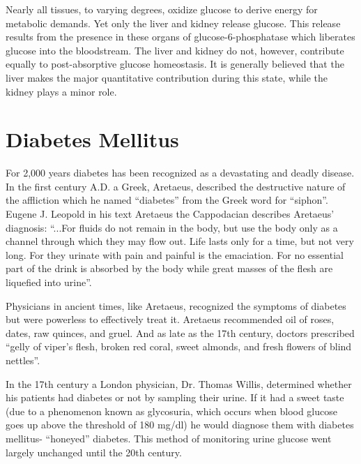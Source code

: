 Nearly all tissues, to varying degrees, oxidize glucose to derive energy for metabolic demands. Yet only the liver and kidney release glucose. This release results from the presence in these organs of glucose-6-phosphatase which liberates glucose into the bloodstream. The liver and kidney do not, however, contribute equally to post-absorptive glucose homeostasis. It is generally believed that the liver makes the major quantitative contribution during this state, while the kidney plays a minor role. 

\section{Diabetes Mellitus}
\label{sec:DiabetesMellitus}

For 2,000 years diabetes has been recognized as a devastating and deadly disease. In the first century A.D. a Greek, Aretaeus, described the destructive nature of the affliction which he named ``diabetes'' from the Greek word for ``siphon''. Eugene J. Leopold in his text Aretaeus the Cappodacian describes Aretaeus' diagnosis: ``...For fluids do not remain in the body, but use the body only as a channel through which they may flow out. Life lasts only for a time, but not very long. For they urinate with pain and painful is the emaciation. For no essential part of the drink is absorbed by the body while great masses of the flesh are liquefied into urine''.

Physicians in ancient times, like Aretaeus, recognized the symptoms of diabetes but were powerless to effectively treat it. Aretaeus recommended oil of roses, dates, raw quinces, and gruel. And as late as the 17th century, doctors prescribed ``gelly of viper's flesh, broken red coral, sweet almonds, and fresh flowers of blind nettles''.

In the 17th century a London physician, Dr. Thomas Willis, determined whether his patients had diabetes or not by sampling their urine. If it had a sweet taste (due to a phenomenon known as glycosuria, which occurs when blood glucose goes up above the threshold of 180 mg/dl) he would diagnose them with diabetes mellitus- ``honeyed'' diabetes. This method of monitoring urine glucose went largely unchanged until the 20th century.

